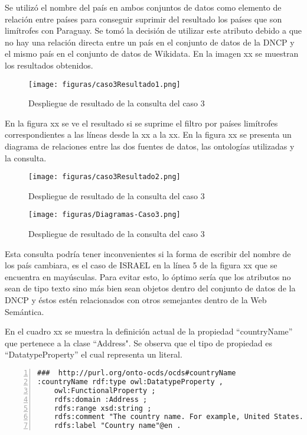 Se utilizó el nombre del país en ambos conjuntos de datos como elemento de relación entre países para conseguir suprimir del resultado los países que son limítrofes con Paraguay. Se tomó la decisión de utilizar este atributo debido a que no hay una relación directa entre un país en el conjunto de datos de la DNCP y el mismo país en el conjunto de datos de Wikidata. En la imagen xx se muestran los resultados obtenidos.


\begin{figure}[ht!]
    \centering
    \texttt{[image: figuras/caso3Resultado1.png]}
    \caption{Despliegue de resultado de la consulta del caso 3}
    \label{img:caso3Resultado1}
 \end{figure}


En la figura xx se ve el resultado si se suprime el filtro por países limítrofes correspondientes a las líneas desde la xx a la xx. En la figura xx se presenta un diagrama de relaciones entre las dos fuentes de datos, las ontologías utilizadas y la consulta.


 \begin{figure}[ht!]
    \centering
    \texttt{[image: figuras/caso3Resultado2.png]}
    \caption{Despliegue de resultado de la consulta del caso 3}
    \label{img:caso3Resultado2}
 \end{figure}


 \begin{figure}[ht!]
    \centering
    \texttt{[image: figuras/Diagramas-Caso3.png]}
    \caption{Despliegue de resultado de la consulta del caso 3}
    \label{img:DiagramaCaso3}
 \end{figure}

 Esta consulta podría tener inconvenientes si la forma de escribir del nombre de los país cambiara, es el caso de ISRAEL en la línea 5 de la figura xx que se encuentra en mayúsculas. Para evitar esto, lo óptimo sería que los atributos no sean de tipo texto sino más bien sean objetos dentro del conjunto de datos de la DNCP y éstos estén relacionados con otros semejantes dentro de la Web Semántica.

En el cuadro xx se muestra la definición actual de la propiedad “countryName” que pertenece a la clase “Address". Se observa que el tipo de propiedad es “DatatypeProperty” el cual representa un literal. 

\begin{lstlisting}[captionpos=b, caption=Información referente al proceso licitatorio cuyo identificacor es, label=3-2,  numbers=left,  numberstyle=\tiny\color{mygray},
    basicstyle=\small,frame=single]
###  http://purl.org/onto-ocds/ocds#countryName
:countryName rdf:type owl:DatatypeProperty ,
    owl:FunctionalProperty ;
    rdfs:domain :Address ;
    rdfs:range xsd:string ;
    rdfs:comment "The country name. For example, United States."@en ;
    rdfs:label "Country name"@en .
 \end{lstlisting}


